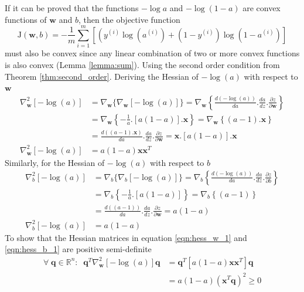 \documentclass[12pt]{report}
\numberwithin{equation}{section}
\begin{document}
If it can be proved that the functions $-\log a$ and $-\log (1-a)$ are convex functions of $\bm{w}$ and $b$, then the objective function 
\[ \mathrm{J}(\bm{w}, b) = -\frac{1}{m} \sum_{i=1}^{m}\left[\left(y^{(i)} \log \left(a^{(i)}\right)+\left(1-y^{(i)}\right) \log \left(1-a^{(i)}\right)\right]\right.
\]
must also be convex since any linear combination of two or more convex functions is also convex (Lemma \ref{lemma:sum}). Using the second order condition from Theorem \ref{thm:second_order}.  Deriving the Hessian of $-\log(a)$ with respect to $\bm{w}$
\begin{equation}\label{eqn:hess_w_1}
\begin{split}
\nabla^2_{\bm{w}}[-\log (a)] &= \nabla_{\bm{w}}\{\nabla_{\bm{w}}[-\log (a)]\} = \nabla_{\bm{w}}\left\{\frac{d(-\log (a))}{da}.\frac{da}{dz}.\frac{\partial z}{\partial \bm{w}} \right\} \\
	&=\nabla_{\bm{w}}\left\{ -\frac{1}{a}.[a(1-a)].\bm{x} \right\} = \nabla_{\bm{w}}\left\{ (a-1).\bm{x} \right\} \\
	&= \frac{d((a-1).\bm{x})}{da}.\frac{da}{dz}.\frac{\partial z}{\partial \bm{w}} = \bm{x}.[a(1-a)].\bm{x} \\
\nabla^2_{\bm{w}}[-\log (a)] &= a(1-a)\bm{x}\bm{x}^T	
\end{split}
\end{equation}
Similarly, for the Hessian of $-\log(a)$ with respect to $b$ 
\begin{equation}\label{eqn:hess_b_1}
\begin{split}
\nabla^2_b[-\log (a)] &= \nabla_b\{\nabla_b[-\log (a)]\} = \nabla_b\left\{\frac{d(-\log (a))}{da}.\frac{da}{dz}.\frac{\partial z}{\partial b} \right\} \\
	&=\nabla_b\left\{ -\frac{1}{a}.[a(1-a)] \right\} = \nabla_b\left\{ (a-1) \right\} \\
	&= \frac{d((a-1))}{da}.\frac{da}{dz}.\frac{\partial z}{\partial \bm{w}} = a(1-a) \\
\nabla^2_b[-\log (a)] &= a(1-a)	
\end{split}
\end{equation}
To show that the Hessian matrices in equation \ref{eqn:hess_w_1} and \ref{eqn:hess_b_1} are positive semi-definite
\begin{equation}\label{eqn:positive1}
\begin{split}
\forall \; \bm{q}\in \mathbb{R}^n: \;\; \bm{q}^T \nabla_{\bm{w}}^2[-\log(a)] \bm{q} & =  \bm{q}^T \left[ a(1-a)\bm{x}\bm{x}^T \right] \bm{q} \\ 
& =  a (1 - a) (\bm{x}^T \bm{q})^2 \geq 0 
\end{split}
\end{equation}
\end{document}

